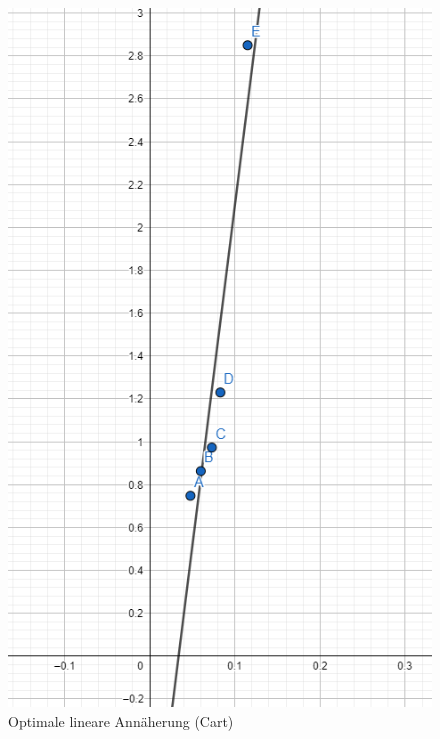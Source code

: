 \documentclass[a4paper, titlepage]{article}
\begin{document}
    \begin{figure}
        \includegraphics[width=\textwidth]{images/extrapolation_cart_small}
        \caption{Optimale lineare Annäherung (Cart)}
        \label{extrapolation_small_cart}
    \end{figure}
\end{document}
